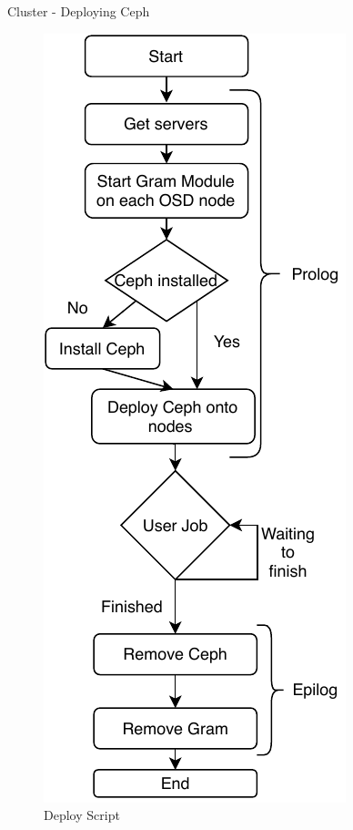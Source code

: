 \begin{frame}{Cluster - Deploying Ceph}
 \begin{figure}
     \centering
     \includegraphics[width=\textwidth,height=0.7\textheight,keepaspectratio]{img/UGECeph.pdf}
     \caption{Deploy Script}
     \label{fig:my_label}
 \end{figure}
\end{frame}
